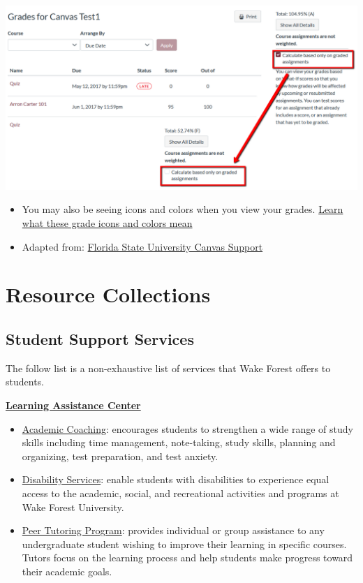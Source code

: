 \begin{center}\includegraphics[width=0.5\linewidth]{img/grades} \end{center}

\begin{itemize}
\item
  You may also be seeing icons and colors when you view your grades. \href{https://community.canvaslms.com/t5/Student-Guide/How-do-I-use-the-icons-and-colors-in-the-Grades-page/ta-p/476}{Learn what these grade icons and colors mean}
\item
  Adapted from: \href{https://support.canvas.fsu.edu/kb/article/1068-students-make-sure-you-are-seeing-the-right-grades-in-canvas/}{Florida State University Canvas Support}
\end{itemize}

\hypertarget{resource-collections}{%
\section{Resource Collections}\label{resource-collections}}

\hypertarget{student-support-services}{%
\subsection{Student Support Services}\label{student-support-services}}

The follow list is a non-exhaustive list of services that Wake Forest offers to students.

\textbf{\href{https://class.wfu.edu/}{Learning Assistance Center}}

\begin{itemize}
\item
  \href{https://class.wfu.edu/}{Academic Coaching}: encourages students to strengthen a wide range of study skills including time management, note-taking, study skills, planning and organizing, test preparation, and test anxiety.
\item
  \href{https://class.wfu.edu/}{Disability Services}: enable students with disabilities to experience equal access to the academic, social, and recreational activities and programs at Wake Forest University.
\item
  \href{https://class.wfu.edu/}{Peer Tutoring Program}: provides individual or group assistance to any undergraduate student wishing to improve their learning in specific courses. Tutors focus on the learning process and help students make progress toward their academic goals.
\end{itemize}

